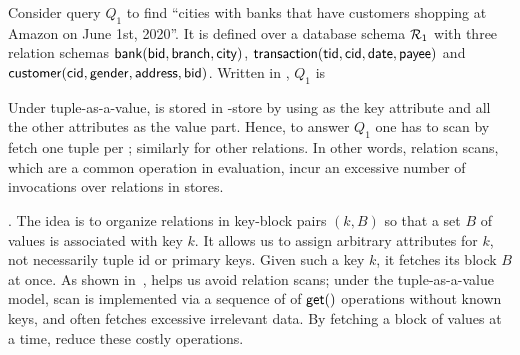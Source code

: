 \begin{example}\label{exa-taav}
Consider query $Q_{1}$ to find ``cities with banks that
have customers shopping at %
Amazon on
June 1st, 2020''. It is
defined over
a database schema ${\mathcal R}_{1}$ with three relation schemas
$\protect\mathsf{bank}(\protect\mathsf{bid},\allowbreak \protect\mathsf{branch},\allowbreak \protect\mathsf{city})$,
$\protect\mathsf{transaction}(\protect\mathsf{tid},\allowbreak \protect\mathsf{cid},\allowbreak \protect\mathsf{date},\allowbreak
\protect\mathsf{payee})$ and $\protect\mathsf{customer}(\protect\mathsf{cid},\allowbreak \protect\mathsf{gender},\allowbreak
\protect\mathsf{address},\allowbreak \protect\mathsf{bid})$. Written in \SQL, $Q_{1}$ is

\vspace{-0.4ex}
{\small
  }
\vspace{-0.7ex}

Under tuple-as-a-value,  is stored in \kv-store
by using  as the key attribute and all the other
attributes as the value part. Hence, to answer $Q_{1}$ one
has to scan  by fetch one tuple per \get;
similarly  for other relations. In other words, relation scans,
which are a common operation in \SQL evaluation, incur an excessive
number of \get invocations over relations in \kv stores.
\end{example}

\vspace{0.6ex}
. The idea is to organize
relations in key-block pairs $(k, B)$ so that a set $B$ of values
is associated with key $k$. It allows us to assign arbitrary
attributes for $k$, not necessarily tuple id or primary keys.
Given such a key $k$, it fetches its block $B$ at once.
As shown in~\cite{VLDB19}, \baav helps us avoid relation scans;
under the tuple-as-a-value model, scan is implemented via
a sequence of %
of $\protect\mathsf{get}()$ operations without known keys,
and often fetches excessive irrelevant data. By fetching a block
of values at a time, \baav reduce these costly operations.



